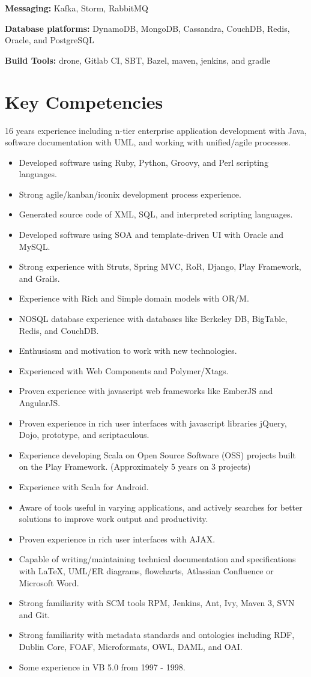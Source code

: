 \documentclass[11pt,a4paper,sans]{moderncv}        %
\begin{document}
\textbf{Messaging:} Kafka, Storm, RabbitMQ

\textbf{Database platforms:} DynamoDB, MongoDB, Cassandra, CouchDB, Redis, Oracle, and PostgreSQL

\textbf{Build Tools:} drone, Gitlab CI, SBT, Bazel, maven, jenkins, and gradle

\section{Key Competencies}
	16 years experience including n-tier enterprise application development with Java, software 
	documentation with UML, and working with unified/agile processes. 
	\begin{itemize}
	\item Developed software using Ruby, Python, Groovy, and Perl scripting languages.
	\item Strong agile/kanban/iconix development process experience.
	\item Generated source code of XML, SQL, and interpreted scripting languages.
	\item Developed software using SOA and template-driven UI with Oracle and MySQL.
	\item Strong experience with Struts, Spring MVC, RoR, Django, Play Framework, and Grails.
	\item Experience with Rich and Simple domain models with OR/M.
	\item NOSQL database experience with databases like Berkeley DB, BigTable, Redis, and CouchDB.
	\item Enthusiasm and motivation to work with new technologies.
	\item Experienced with Web Components and Polymer/Xtags.
	\item Proven experience with javascript web frameworks like EmberJS and AngularJS.
	\item Proven experience in rich user interfaces with javascript libraries jQuery, Dojo, 
	  prototype, and scriptaculous.
	\item Experience developing Scala on Open Source Software (OSS) projects built on the Play Framework. (Approximately 5 years on 3 projects)
	\item Experience with Scala for Android. 
	\item Aware of tools useful in varying applications, and actively
	  searches for better solutions to improve work output and productivity.
	\item Proven experience in rich user interfaces with AJAX.
	\item Capable of writing/maintaining technical documentation and
	  specifications with LaTeX, UML/ER diagrams, flowcharts, Atlassian Confluence or Microsoft Word.
	\item Strong familiarity with SCM tools RPM, Jenkins, Ant, Ivy, Maven 3, SVN and Git.
	\item Strong familiarity with metadata standards and ontologies
	  including RDF, Dublin Core, FOAF, Microformats, OWL, DAML, and OAI.
	\item Some experience in VB 5.0 from 1997 - 1998.
\end{itemize}
\end{document}

